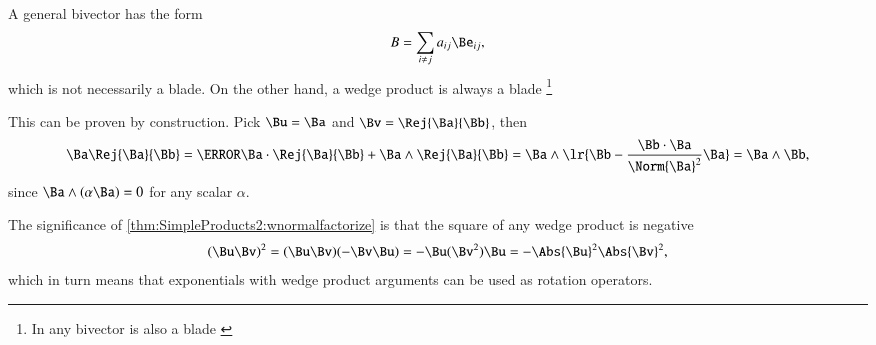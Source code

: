 %
%
A general bivector has the form
\begin{dmath}\label{eqn:normalFactorization:1800}
B = \sum_{i \ne j} a_{ij} \Be_{ij},
\end{dmath}
which is not necessarily a blade.
On the other hand, a wedge product is always a blade
\footnote{In  any bivector is also a blade \citep{ablamowicz2004lectures:chapter1}}


This can be proven by construction.
Pick \( \Bu = \Ba \) and \( \Bv = \Rej{\Ba}{\Bb} \), then
\begin{dmath}\label{eqn:normalFactorization:1840}
\Ba \Rej{\Ba}{\Bb}
=
\cancel{\Ba \cdot \Rej{\Ba}{\Bb}}
+
\Ba \wedge \Rej{\Ba}{\Bb}
=
\Ba \wedge \lr{ \Bb - \frac{\Bb \cdot \Ba}{\Norm{\Ba}^2} \Ba }
=
\Ba \wedge \Bb,
\end{dmath}
since \( \Ba \wedge (\alpha \Ba) = 0 \) for any scalar \( \alpha \).

The significance of \cref{thm:SimpleProducts2:wnormalfactorize} is that the square of any wedge product is negative
\begin{dmath}\label{eqn:normalFactorization:1820}
(\Bu \Bv)^2
=
(\Bu \Bv) (-\Bv \Bu)
=
-\Bu (\Bv^2) \Bu
=
- \Abs{\Bu}^2 \Abs{\Bv}^2,
\end{dmath}
which in turn means that exponentials with wedge product arguments can be used as rotation operators.


